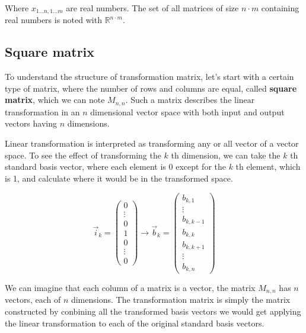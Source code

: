 Where \(x_{1...n,1...m}\) are real numbers. The set of all matrices of size \(n \cdot m\) containing real numbers is noted with \(\mathbb{R}^{n \cdot m}\).

\subsection{Square matrix}

To understand the structure of transformation matrix, let's start with a certain type of matrix, where the number of rows and columns are equal, called \textbf{square matrix}, which we can note \(M_{n, n}\). Such a matrix describes the linear transformation in an \(n\) dimensional vector space with both input and output vectors having \(n\) dimensions.

Linear transformation is interpreted as transforming any or all vector of a vector space. To see the effect of transforming the \(k\) th dimension, we can take the \(k\) th standard basis vector, where each element is \(0\) except for the \(k\) th element, which is 1, and calculate where it would be in the transformed space.

\[\vec i_k = \begin{pmatrix} 0 \\ \vdots \\ 0 \\ 1 \\ 0 \\  \vdots \\ 0 \end{pmatrix} \rightarrow \vec b_k = \begin{pmatrix} b_{k,1} \\ \vdots \\ b_{k,k-1} \\ b_{k,k} \\ b_{k,k+1} \\ \vdots \\ b_{k,n} \end{pmatrix} \]

We can imagine that each column of a matrix is a vector, the matrix \(M_{n, n}\) has \(n\) vectors, each of \(n\) dimensions. The transformation matrix is simply the matrix constructed by conbining all the transformed basis vectors we would get applying the linear transformation to each of the original standard basis vectors.

